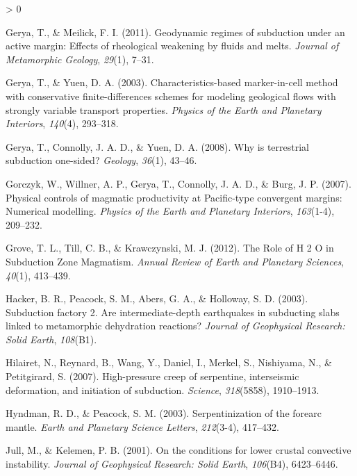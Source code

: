 \documentclass[draft,linenumbers]{agujournal2018}
\newlength{\cslhangindent}
\newenvironment{CSLReferences}[2] %
 {%
  \setlength{\parindent}{0pt}
  \ifodd #1 \everypar{\setlength{\hangindent}{\cslhangindent}}\ignorespaces\fi
  \ifnum #2 > 0
  \setlength{\parskip}{#2\baselineskip}
  \fi
 }%
 {}
\begin{document}
\begin{CSLReferences}{1}{0}
\leavevmode{}%
Gerya, T., \& Meilick, F. I. (2011). Geodynamic regimes of subduction
under an active margin: Effects of rheological weakening by fluids and
melts. \emph{Journal of Metamorphic Geology}, \emph{29}(1), 7--31.

\leavevmode{}%
Gerya, T., \& Yuen, D. A. (2003). {Characteristics-based marker-in-cell
method with conservative finite-differences schemes for modeling
geological flows with strongly variable transport properties}.
\emph{Physics of the Earth and Planetary Interiors}, \emph{140}(4),
293--318.

\leavevmode{}%
Gerya, T., Connolly, J. A. D., \& Yuen, D. A. (2008). {Why is
terrestrial subduction one-sided?} \emph{Geology}, \emph{36}(1), 43--46.

\leavevmode{}%
Gorczyk, W., Willner, A. P., Gerya, T., Connolly, J. A. D., \& Burg, J.
P. (2007). {Physical controls of magmatic productivity at Pacific-type
convergent margins: Numerical modelling}. \emph{Physics of the Earth and
Planetary Interiors}, \emph{163}(1-4), 209--232.

\leavevmode{}%
Grove, T. L., Till, C. B., \& Krawczynski, M. J. (2012). {The Role of H
2 O in Subduction Zone Magmatism}. \emph{Annual Review of Earth and
Planetary Sciences}, \emph{40}(1), 413--439.

\leavevmode{}%
Hacker, B. R., Peacock, S. M., Abers, G. A., \& Holloway, S. D. (2003).
{Subduction factory 2. Are intermediate-depth earthquakes in subducting
slabs linked to metamorphic dehydration reactions?} \emph{Journal of
Geophysical Research: Solid Earth}, \emph{108}(B1).

\leavevmode{}%
Hilairet, N., Reynard, B., Wang, Y., Daniel, I., Merkel, S., Nishiyama,
N., \& Petitgirard, S. (2007). High-pressure creep of serpentine,
interseismic deformation, and initiation of subduction. \emph{Science},
\emph{318}(5858), 1910--1913.

\leavevmode{}%
Hyndman, R. D., \& Peacock, S. M. (2003). Serpentinization of the
forearc mantle. \emph{Earth and Planetary Science Letters},
\emph{212}(3-4), 417--432.

\leavevmode{}%
Jull, M., \& Kelemen, P. B. (2001). On the conditions for lower crustal
convective instability. \emph{Journal of Geophysical Research: Solid
Earth}, \emph{106}(B4), 6423--6446.


\end{CSLReferences}
\end{document}
